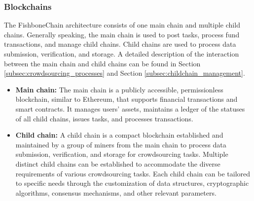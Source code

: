 \documentclass[10pt,journal]{IEEEtran}
\begin{document}
\subsubsection{\textbf{Blockchains}}

The FishboneChain architecture consists of one main chain and multiple child chains. Generally speaking, the main chain is used to post tasks, process fund transactions, and manage child chains. Child chains are used to process data submission, verification, and storage. A detailed description of the interaction between the main chain and child chains can be found in Section \ref{subsec:crowdsourcing_processes} and Section \ref{subsec:childchain_management}.

\begin{itemize}
    \item \textbf{Main chain:}
    The main chain is a publicly accessible, permissionless blockchain, similar to Ethereum, that supports financial transactions and smart contracts. It manages users' assets, maintains a ledger of the statuses of all child chains, issues tasks, and processes transactions.

    \item \textbf{Child chain:}
    A child chain is a compact blockchain established and maintained by a group of miners from the main chain to process data submission, verification, and storage for crowdsourcing tasks. Multiple distinct child chains can be established to accommodate the diverse requirements of various crowdsourcing tasks. Each child chain can be tailored to specific needs through the customization of data structures, cryptographic algorithms, consensus mechanisms, and other relevant parameters.

\end{itemize}
\end{document}

